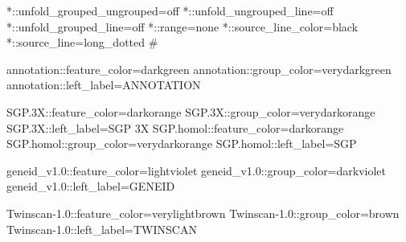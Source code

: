 \documentclass[11pt]{article}
\def\nwendcode{\endtrivlist \endgroup} %
\let\nwdocspar=\par                    %
\begin{document}
\nwenddocs{}\endmoddef
*::unfold_grouped_ungrouped=off
*::unfold_ungrouped_line=off
*::unfold_grouped_line=off
*::range=none
*::source_line_color=black
*::source_line=long_dotted
#
\nwendcode{}\nwdocspar
 
\nwenddocs{}\endmoddef
annotation::feature_color=darkgreen
annotation::group_color=verydarkgreen
annotation::left_label=ANNOTATION
\nwendcode{}\nwdocspar

\nwenddocs{}\endmoddef
SGP.3X::feature_color=darkorange
SGP.3X::group_color=verydarkorange
SGP.3X::left_label=SGP 3X
SGP.homol::feature_color=darkorange
SGP.homol::group_color=verydarkorange
SGP.homol::left_label=SGP
\nwendcode{}\nwdocspar

\nwenddocs{}\endmoddef
geneid_v1.0::feature_color=lightviolet
geneid_v1.0::group_color=darkviolet
geneid_v1.0::left_label=GENEID
\nwendcode{}\nwdocspar

\nwenddocs{}\endmoddef
Twinscan-1.0::feature_color=verylightbrown
Twinscan-1.0::group_color=brown
Twinscan-1.0::left_label=TWINSCAN
\nwendcode{}\nwdocspar
\end{document}
